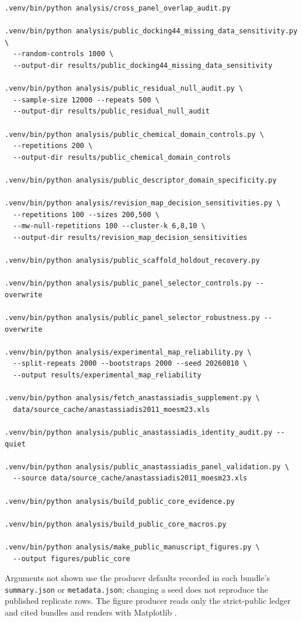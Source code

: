 \documentclass[11pt]{article}
\begin{document}
\begin{verbatim}
.venv/bin/python analysis/cross_panel_overlap_audit.py

.venv/bin/python analysis/public_docking44_missing_data_sensitivity.py \
  --random-controls 1000 \
  --output-dir results/public_docking44_missing_data_sensitivity

.venv/bin/python analysis/public_residual_null_audit.py \
  --sample-size 12000 --repeats 500 \
  --output-dir results/public_residual_null_audit

.venv/bin/python analysis/public_chemical_domain_controls.py \
  --repetitions 200 \
  --output-dir results/public_chemical_domain_controls

.venv/bin/python analysis/public_descriptor_domain_specificity.py

.venv/bin/python analysis/revision_map_decision_sensitivities.py \
  --repetitions 100 --sizes 200,500 \
  --mw-null-repetitions 100 --cluster-k 6,8,10 \
  --output-dir results/revision_map_decision_sensitivities

.venv/bin/python analysis/public_scaffold_holdout_recovery.py

.venv/bin/python analysis/public_panel_selector_controls.py --overwrite

.venv/bin/python analysis/public_panel_selector_robustness.py --overwrite

.venv/bin/python analysis/experimental_map_reliability.py \
  --split-repeats 2000 --bootstraps 2000 --seed 20260810 \
  --output results/experimental_map_reliability

.venv/bin/python analysis/fetch_anastassiadis_supplement.py \
  data/source_cache/anastassiadis2011_moesm23.xls

.venv/bin/python analysis/public_anastassiadis_identity_audit.py --quiet

.venv/bin/python analysis/public_anastassiadis_panel_validation.py \
  --source data/source_cache/anastassiadis2011_moesm23.xls

.venv/bin/python analysis/build_public_core_evidence.py

.venv/bin/python analysis/build_public_core_macros.py

.venv/bin/python analysis/make_public_manuscript_figures.py \
  --output figures/public_core
\end{verbatim}

Arguments not shown use the producer defaults recorded in each bundle's
\texttt{summary.json} or \texttt{metadata.json}; changing a seed does not
reproduce the published replicate rows. The figure producer reads only the
strict-public ledger and cited bundles and renders with Matplotlib
\cite{matplotlib2007}.
\end{document}

